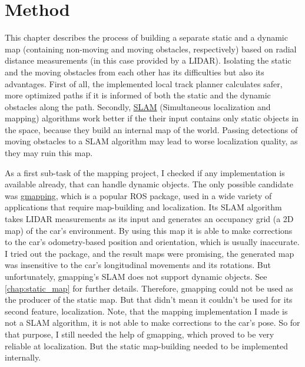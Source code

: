 \section{Method}
This chapter describes the process of building a separate static and a dynamic map (containing non-moving and moving obstacles, respectively) based on radial distance measurements (in this case provided by a LIDAR). Isolating the static and the moving obstacles from each other has its difficulties but also its advantages. First of all, the implemented local track planner calculates safer, more optimized paths if it is informed of both the static and the dynamic obstacles along the path. Secondly, \href{https://en.wikipedia.org/wiki/Simultaneous_localization_and_mapping}{SLAM} (Simultaneous localization and mapping) algorithms work better if the their input contains only static objects in the space, because they build an internal map of the world. Passing detections of moving obstacles to a SLAM algorithm may lead to worse localization quality, as they may ruin this map.

As a first sub-task of the mapping project, I checked if any implementation is available already, that can handle dynamic objects. The only possible candidate was \href{http://wiki.ros.org/gmapping}{gmapping}, which is a popular ROS package, used in a wide variety of applications that require map-building and localization. Its SLAM algorithm takes LIDAR measurements as its input and generates an occupancy grid (a 2D map) of the car's environment. By using this map it is able to make corrections to the car's odometry-based position and orientation, which is usually inaccurate. I tried out the package, and the result maps were promising, the generated map was insensitive to the car's longitudinal movements and its rotations. But unfortunately, gmapping's SLAM does not support dynamic objects. See \ref{chap:static_map} for further details. Therefore, gmapping could not be used as the producer of the static map. But that didn't mean it couldn't be used for its second feature, localization. Note, that the mapping implementation I made is not a SLAM algorithm, it is not able to make corrections to the car's pose. So for that purpose, I still needed the help of gmapping, which proved to be very reliable at localization. But the static map-building needed to be implemented internally.

